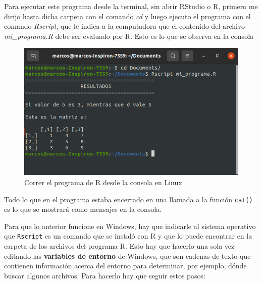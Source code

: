 \documentclass[
]{book}
\begin{document}
Para ejecutar este programa desde la terminal, sin abrir RStudio o R, primero me dirijo hasta dicha carpeta con el comando \emph{cd} y luego ejecuto el programa con el comando \emph{Rscript}, que le indica a la computadora que el contenido del archivo \emph{mi\_programa.R} debe ser evaluado por R. Esto es lo que se observa en la consola

\begin{figure}

{\centering \includegraphics[width=0.8\linewidth]{images/07_otros/consola} 

}

\caption{Correr el programa de R desde la consola en Linux}\label{fig:unnamed-chunk-197}
\end{figure}

Todo lo que en el programa estaba encerrado en una llamada a la función \texttt{cat()} es lo que se mostrará como mensajes en la consola.

Para que lo anterior funcione en Windows, hay que indicarle al sistema operativo que \texttt{Rscript} es un comando que se instaló con R y que lo puede encontrar en la carpeta de los archivos del programa R. Esto hay que hacerlo una sola vez editando las \textbf{variables de entorno} de Windows, que son cadenas de texto que contienen información acerca del entorno para determinar, por ejemplo, dónde buscar algunos archivos. Para hacerlo hay que seguir estos pasos:
\end{document}

